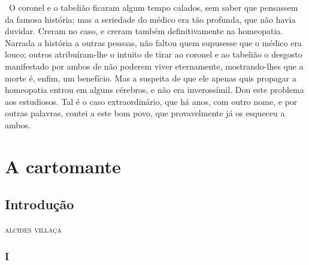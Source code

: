 ~O coronel e o tabelião ficaram algum tempo calados, sem saber que
pensassem da famosa história; mas a seriedade do médico era tão
profunda, que não havia duvidar. Creram no caso, e creram também
definitivamente na homeopatia. Narrada a história a outras pessoas, não
faltou quem supusesse que o médico era louco; outros atribuíram-lhe o
intuito de tirar ao coronel e ao tabelião o desgosto manifestado por
ambos de não poderem viver eternamente, mostrando-lhes que a morte é,
enfim, um benefício. Mas a suspeita de que ele apenas quis propagar a
homeopatia entrou em alguns cérebros, e não era inverossímil. Dou este
problema aos estudiosos. Tal é o caso extraordinário, que há anos, com
outro nome, e por outras palavras, contei a este bom povo, que
provavelmente já os esqueceu a ambos. ~

\part{A cartomante}

\chapter[Introdução, \emph{por Alcides Villaça}]{Introdução}

\begin{flushright}
\textsc{alcides villaça}
\end{flushright}

\section{I}

